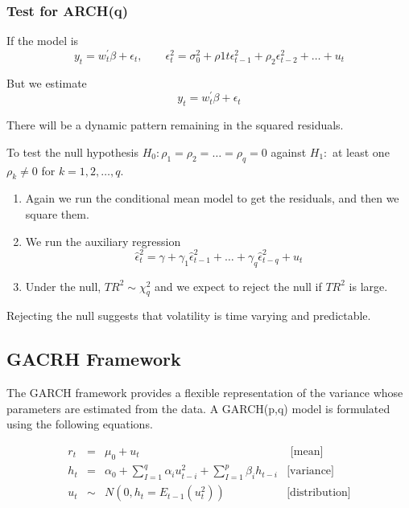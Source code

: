 \documentclass[11pt]{article}
\begin{document}
\subsubsection{Test for ARCH(q)}

If the model is
\[y_t = w_t^\prime \beta + \epsilon_t, \qquad \epsilon_t^2 = \sigma_0^2 + \rho1t \epsilon_{t-1}^2 + \rho_2 \epsilon_{t-2}^2 + \ldots + u_t\]

But we estimate
\[y_t = w_t^\prime \beta + \epsilon_t\]

There will be a dynamic pattern remaining in the squared residuals.

\begin{procedure}

To test the null hypothesis $H_0: \rho_1 = \rho_2 = \ldots = \rho_q = 0$ against $H_1:$ at least one $\rho_k \neq0$ for $k = 1,2,\ldots, q$.

\begin{enumerate}

\item Again we run the conditional mean model to get the residuals, and then we square them.

\item We run the auxiliary regression
\[\hat{\epsilon}_{t}^2 = \gamma + \gamma_1 \hat{\epsilon}_{t-1}^2 + \ldots + \gamma_q \hat{\epsilon}_{t-q}^2 + u_t \]

\item Under the null, $TR^2\sim \chi_q^2$ and we expect to reject the null if $TR^2$ is large.

\end{enumerate}

Rejecting the null suggests that volatility is time varying and predictable.

\end{procedure}

\subsection{GACRH Framework}

The GARCH framework provides a flexible representation of the variance whose parameters are estimated from the data. A GARCH(p,q) model is formulated using the following equations.

\begin{equation}
\begin{array}{cccc}
r_t & = & \mu_0 + u_t & \text{ [mean]} \\
h_t & = & \alpha_0 + \sum_{I=1}^q \alpha_i u_{t-i}^2 + \sum_{I=1}^p \beta_i h_{t-i} & \text{[variance]} \\
u_t & \sim & N(0,h_t = E_{t-1}(u_t^2)) & \text{[distribution]}
\end{array}
\end{equation}
\end{document}
